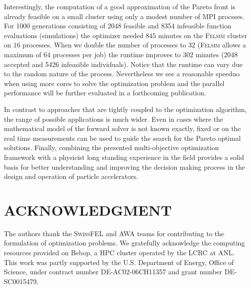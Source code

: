 \documentclass[%
reprint,
amsmath,amssymb,
aps,
]{revtex4-1}
\begin{document}
Interestingly, the computation of a good approximation of the Pareto front is
  already feasible on a small cluster using only a modest number of MPI
  procsses.
For 1000 generations consisting of 2048 feasible and 8354 infeasible function
  evaluations (simulations) the optimizer needed $845$ minutes on the
  \textsc{Felsim} cluster on $16$ processes.
When we double the number of processes to $32$ (\textsc{Felsim} allows a
  maximum of $64$ processes per job) the runtime improves to $302$ minutes (2048
  accepted and 5426 infeasible individuals).
Notice that the runtime can vary due to the random nature of the process.
Nevertheless we see a reasonable speeduo when using more cores to solve the
  optimization problem and the parallel performance will be further evaluated
  in a forthcoming publication.

In contrast to approaches that are tightly coupled to the optimization
  algorithm, the range of possible applications is much wider.
Even in cases where the mathematical model of the forward solver is not known
  exactly, fixed or on the real time measurements can be used to guide the
  search for the Pareto optimal solutions.
Finally, combining the presented multi-objective optimization framework with
  a physicist long standing experience in the field provides a solid basis
  for better understanding and improving the decision making process in the
  design and operation of particle accelerators.


\section{ACKNOWLEDGMENT}

The authors thank the \textsc{SwissFEL} and AWA teams for contributing to the
  formulation of optimization problems. 
  We gratefully acknowledge the computing resources provided on Bebop,
  a HPC cluster operated by the LCRC at ANL.
  This work was partly supported by the 
  U.S. Department of Energy, Office of Science, under 
  contract number DE-AC02-06CH11357 and grant number DE-SC0015479. 


\end{document}
